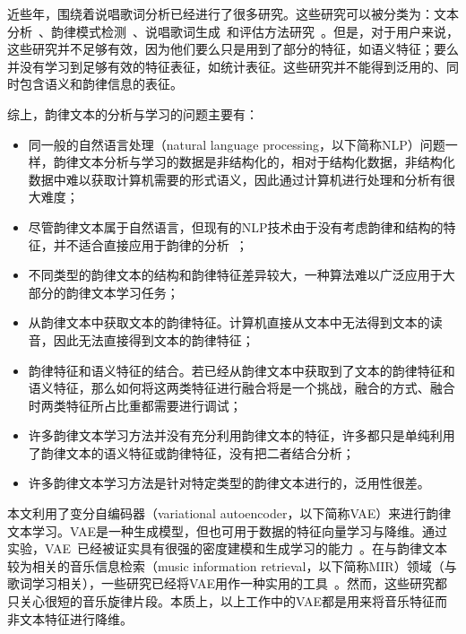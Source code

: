 近些年，围绕着说唱歌词分析已经进行了很多研究。这些研究可以被分类为：文本分析~\cite{Potash2015GhostWriter}、韵律模式检测~\cite{hirjee2010using,addanki2013unsupervised}、说唱歌词生成~\cite{Potash2015GhostWriter,wu2013learning}和评估方法研究~\cite{hirjee2010using,potash2016evaluating,Malmi2016dopelearning}。但是，对于用户来说，这些研究并不足够有效，因为他们要么只是用到了部分的特征，如语义特征；要么并没有学习到足够有效的特征表征，如统计表征。这些研究并不能得到泛用的、同时包含语义和韵律信息的表征。\par

综上，韵律文本的分析与学习的问题主要有：
\begin{itemize}
  \item 同一般的自然语言处理（natural language processing，以下简称NLP）问题一样，韵律文本分析与学习的数据是非结构化的，相对于结构化数据，非结构化数据中难以获取计算机需要的形式语义，因此通过计算机进行处理和分析有很大难度；
  \item 尽管韵律文本属于自然语言，但现有的NLP技术由于没有考虑韵律和结构的特征，并不适合直接应用于韵律的分析~\cite{wu2013learning}；
  \item 不同类型的韵律文本的结构和韵律特征差异较大，一种算法难以广泛应用于大部分的韵律文本学习任务；
  \item 从韵律文本中获取文本的韵律特征。计算机直接从文本中无法得到文本的读音，因此无法直接得到文本的韵律特征；
  \item 韵律特征和语义特征的结合。若已经从韵律文本中获取到了文本的韵律特征和语义特征，那么如何将这两类特征进行融合将是一个挑战，融合的方式、融合时两类特征所占比重都需要进行调试；
  \item 许多韵律文本学习方法并没有充分利用韵律文本的特征，许多都只是单纯利用了韵律文本的语义特征或韵律特征，没有把二者结合分析；
  \item 许多韵律文本学习方法是针对特定类型的韵律文本进行的，泛用性很差。
\end{itemize}
\par

本文利用了变分自编码器（variational autoencoder，以下简称VAE）来进行韵律文本学习。VAE是一种生成模型，但也可用于数据的特征向量学习与降维。通过实验，VAE~\cite{kingma2014auto}已经被证实具有很强的密度建模和生成学习的能力~\cite{hou2017deep}。在与韵律文本较为相关的音乐信息检索（music information retrieval，以下简称MIR）领域（与歌词学习相关），一些研究已经将VAE用作一种实用的工具~\cite{alexey2017music,hadjeres2017glsr}。然而，这些研究都只关心很短的音乐旋律片段。本质上，以上工作中的VAE都是用来将音乐特征而非文本特征进行降维。\par

